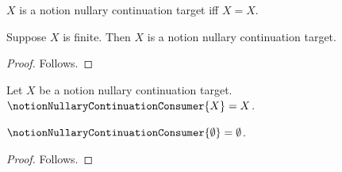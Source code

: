 

\begin{definition}\label{notion_nullary_continuation_target}
    $X$ is a notion nullary continuation target iff $X=X$.
\end{definition}

\begin{classification}\label{notion_finite_is_nullary_continuation_target}
    Suppose $X$ is finite.
    Then $X$ is a notion nullary continuation target.
\end{classification}
\begin{proof}
    Follows.
\end{proof}

\begin{definition}\label{notion_nullary_continuation_consumer}
    Let $X$ be a notion nullary continuation target.
    $\notionNullaryContinuationConsumer{X}=X$.
\end{definition}

\begin{proposition}\label{notion_nullary_classification_continuation}
    $\notionNullaryContinuationConsumer{\emptyset}=\emptyset$.
\end{proposition}
\begin{proof}
    Follows.
\end{proof}
